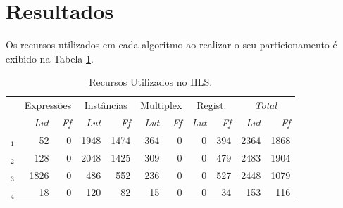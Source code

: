 \section{Resultados}
    Os recursos utilizados em cada algoritmo ao realizar o seu particionamento é exibido na Tabela \ref{tab:hls}.
    \begin{table}[h]\centering
        \vspace{-1em}
        \scriptsize
        \caption{Recursos Utilizados no HLS.}
        \begin{tabular}{rrr|rr|rr|rr||rr}
            \toprule
            &\multicolumn{2}{c}{Expressões} & \multicolumn{2}{c}{Instâncias}      & \multicolumn{2}{c}{Multiplex}  & \multicolumn{2}{c}{Regist.} & \multicolumn{2}{c}{\textit{Total}} \\
            \cmidrule{2-11}
            & \textit{Lut} & \textit{Ff} & \textit{Lut} & \textit{Ff} & \textit{Lut} & \textit{Ff} & \textit{Lut} & \textit{Ff} & \textit{Lut} & \textit{Ff} \\
            \midrule
            \A$_1$&52 & 0     & 1948 & 1474   & 364 & 0      & 0 & 394   & 2364 & 1868 \\ 
            \A$_2$&128 & 0    & 2048 & 1425   & 309 & 0      & 0 & 479   & 2483 & 1904 \\ 
            \A$_3$&1826 & 0   & 486 & 552     & 236 & 0      & 0 & 527   & 2448 & 1079 \\ 
            \A$_4$&18 & 0     & 120  & 82     & 15  & 0      & 0 & 34    & 153  & 116  \\ 
            \bottomrule
        \end{tabular}
        \label{tab:hls}
    \end{table}

